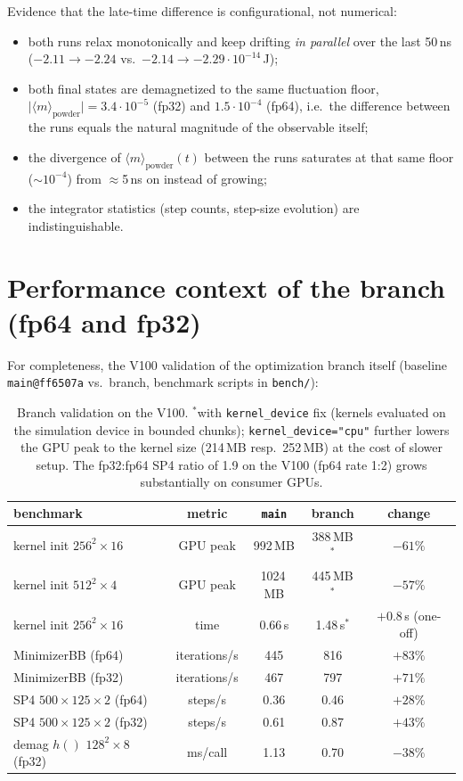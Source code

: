 \documentclass[11pt,a4paper]{article}
\begin{document}
Evidence that the late-time difference is configurational, not numerical:
\begin{itemize}
\item both runs relax monotonically and keep drifting \emph{in parallel} over the
      last 50\,ns ($-2.11\to-2.24$ vs.\ $-2.14\to-2.29\cdot10^{-14}$\,J);
\item both final states are demagnetized to the same fluctuation floor,
      $\lvert\langle m\rangle_\mathrm{powder}\rvert = 3.4\cdot10^{-5}$ (fp32) and
      $1.5\cdot10^{-4}$ (fp64), i.e.\ the difference between the runs equals the
      natural magnitude of the observable itself;
\item the divergence of $\langle m\rangle_\mathrm{powder}(t)$ between the runs
      saturates at that same floor ($\sim10^{-4}$) from $\approx$5\,ns on instead
      of growing;
\item the integrator statistics (step counts, step-size evolution) are
      indistinguishable.
\end{itemize}

\section{Performance context of the branch (fp64 and fp32)}
\label{sec:perf}

For completeness, the V100 validation of the optimization branch itself
(baseline \texttt{main@ff6507a} vs.\ branch, benchmark scripts in
\texttt{bench/}):

\begin{table}[h]\centering\small
\begin{tabular}{lcccc}
\toprule
benchmark & metric & \texttt{main} & branch & change \\
\midrule
kernel init $256^2{\times}16$ & GPU peak & 992\,MB & 388\,MB$^\ast$ & $-61\%$ \\
kernel init $512^2{\times}4$ & GPU peak & 1024\,MB & 445\,MB$^\ast$ & $-57\%$ \\
kernel init $256^2{\times}16$ & time & 0.66\,s & 1.48\,s$^\ast$ & $+0.8$\,s (one-off) \\
MinimizerBB (fp64) & iterations/s & 445 & 816 & $+83\%$ \\
MinimizerBB (fp32) & iterations/s & 467 & 797 & $+71\%$ \\
SP4 $500{\times}125{\times}2$ (fp64) & steps/s & 0.36 & 0.46 & $+28\%$ \\
SP4 $500{\times}125{\times}2$ (fp32) & steps/s & 0.61 & 0.87 & $+43\%$ \\
demag $h()$ $128^2{\times}8$ (fp32) & ms/call & 1.13 & 0.70 & $-38\%$ \\
\bottomrule
\end{tabular}
\caption{Branch validation on the V100. $^\ast$with \texttt{kernel\_device} fix
(kernels evaluated on the simulation device in bounded chunks);
\texttt{kernel\_device="cpu"} further lowers the GPU peak to the kernel size
(214\,MB resp.\ 252\,MB) at the cost of slower setup. The fp32:fp64 SP4 ratio of
1.9 on the V100 (fp64 rate 1:2) grows substantially on consumer GPUs.}
\end{table}
\end{document}
